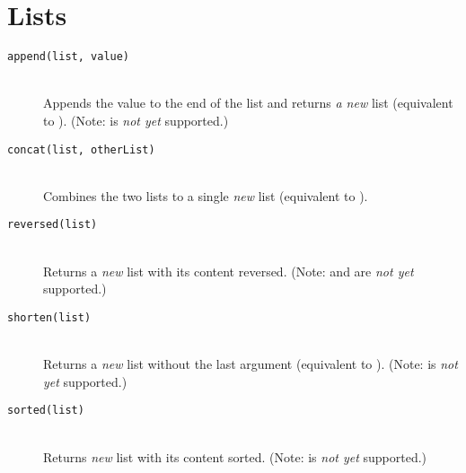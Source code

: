 \section{Lists}
\begin{description}
\item[\texttt{append(list, value)}] \hfill \\
	Appends the value to the end of the list and returns \emph{a new} list (equivalent to ).
(Note:  is \emph{not yet} supported.)
\item[\texttt{concat(list, otherList)}] \hfill \\
	Combines the two lists to a single \emph{new} list (equivalent to ).
\item[\texttt{reversed(list)}] \hfill \\
	Returns a \emph{new} list with its content reversed.
(Note:  and  are \emph{not yet} supported.)
\item[\texttt{shorten(list)}] \hfill \\
	Returns a \emph{new} list without the last argument (equivalent to ).
(Note:  is \emph{not yet} supported.)
\item[\texttt{sorted(list)}] \hfill \\
	Returns \emph{new} list with its content sorted.
(Note:  is \emph{not yet} supported.)
\end{description}


